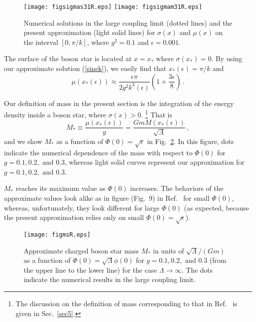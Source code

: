 \documentclass[
aps,prd,
12pt,%
nopreprintnumbers,
showpacs,
eqsecnum,
nofootinbib
]{revtex4-1}
\begin{document}
\begin{figure}[ht]
\centering
\texttt{[image: figsigmas31R.eps]}
\texttt{[image: figsigmam31R.eps]}
\caption{
Numerical solutions in the large coupling limit (dotted lines) and the present
approximation (light solid lines) for $\sigma(x)$ and $\mu(x)$ on the
interval $[0,
\pi/k]$, where $g^2=0.1$
and
 $\epsilon=0.001$.}
\label{figs31}
\end{figure}

The surface of the boson star is located at $x=x_*$ where
$\sigma(x_*)=0$. By using our approximate solution (\ref{sinek}),
we easily find that  $x_*(\epsilon)=\pi/k$ and
\begin{equation}
\mu(x_*(\epsilon))\approx\frac{\epsilon\pi}{2g^2k^3(\epsilon)}\left(1+\frac{3\epsilon}{8}
\right)\,.
\end{equation}

Our definition of mass in the present section is the integration of the energy
density inside a boson star, where $\sigma(x)>0$.%
\footnote{The discussion on the definition of mass corresponding to that in
Ref.~\cite{Jetzer,JB} is given in Sec.~\ref{sec5}.}
That is
\begin{equation}
M_*\equiv\frac{\mu(x_*(\epsilon))}{g}=\frac{GmM(x_*(\epsilon))}{\sqrt{\Lambda}}\,,
\end{equation}
and we show $M_*$ as a function of $\Phi(0)=\sqrt{\epsilon}$ in Fig.~\ref{figms}.
In this figure, dots indicate the numerical dependence of the mass with respect to
$\Phi(0)$ for $g=0.1, 0.2, \mbox{~and~} 0.3$, whereas light solid curves represent
our approximation for
$g=0.1, 0.2, \mbox{~and~} 0.3$. 

$M_*$ reaches its maximum value as $\Phi(0)$ increases.
The behaviors of the approximate values look alike as in figure (Fig.~9) in
Ref.~\cite{Jetzer} for small
$\Phi(0)$, whereas, unfortunately, they look different  for large $\Phi(0)$ (as
expected, because the present approximation relies only on small
$\Phi(0)=\sqrt{\epsilon}$).

\begin{figure}[ht]
\centering
\texttt{[image: figmsR.eps]}
\caption{
Approximate charged boson star mass $M_*$ in units of $\sqrt{\Lambda}/(Gm)$ as
a function of
$\Phi(0)=\sqrt{\Lambda}\phi(0)$ for $g=0.1, 0.2, \mbox{~and~} 0.3$ (from the upper
line to the lower line) for the case $\Lambda\rightarrow\infty$. The dots indicate
the numerical results in the large coupling limit.}
\label{figms}
\end{figure}
\end{document}
